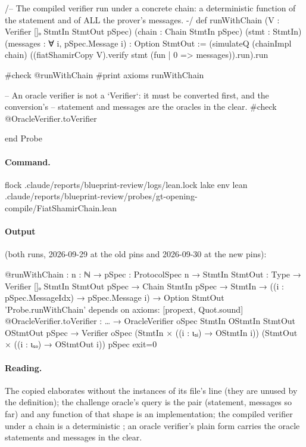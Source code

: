 \begin{leancode}
/-- The compiled verifier run under a concrete chain: a deterministic function of the statement
and of ALL the prover's messages. -/
def runWithChain (V : Verifier []ₒ StmtIn StmtOut pSpec) (chain : Chain StmtIn pSpec)
    (stmt : StmtIn) (messages : ∀ i, pSpec.Message i) : Option StmtOut :=
  (simulateQ (chainImpl chain) ((fiatShamirCopy V).verify stmt (fun | 0 => messages)).run).run

#check @runWithChain
#print axioms runWithChain

-- An oracle verifier is not a `Verifier`: it must be converted first, and the conversion's
-- statement and messages are the oracles in the clear.
#check @OracleVerifier.toVerifier

end Probe
\end{leancode}

\paragraph{Command.}
\begin{shellcode}
flock .claude/reports/blueprint-review/logs/lean.lock lake env lean .claude/reports/blueprint-review/probes/gt-opening-compile/FiatShamirChain.lean
\end{shellcode}

\paragraph{Output} (both runs, 2026-09-29 at the old pins and 2026-09-30 at the new pins):
\begin{shellcode}
@runWithChain : {n : ℕ} → {pSpec : ProtocolSpec n} → {StmtIn StmtOut : Type} →
  Verifier []ₒ StmtIn StmtOut pSpec → Chain StmtIn pSpec → StmtIn →
  ((i : pSpec.MessageIdx) → pSpec.Message i) → Option StmtOut
'Probe.runWithChain' depends on axioms: [propext, Quot.sound]
@OracleVerifier.toVerifier : … → OracleVerifier oSpec StmtIn OStmtIn StmtOut OStmtOut pSpec →
  Verifier oSpec (StmtIn × ((i : ιₛᵢ) → OStmtIn i)) (StmtOut × ((i : ιₛₒ) → OStmtOut i)) pSpec
exit=0
\end{shellcode}

\paragraph{Reading.} The copied  elaborates without the
 instances of its file's  line (they are unused by the definition);
the challenge oracle's query is the pair (statement, messages so far) and any function of that shape
is an implementation; the compiled verifier under a chain is a deterministic ; an
oracle verifier's plain form carries the oracle statements and messages in the clear.

